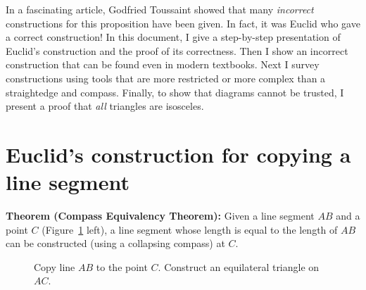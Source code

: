 \documentclass[11pt,a4paper]{article}
\begin{document}
In a fascinating article, Godfried Toussaint \cite{toussaint} showed that many \emph{incorrect} constructions for this proposition have been given. In fact, it was Euclid who gave a correct construction! In this document, I give a step-by-step presentation of Euclid's construction and the proof of its correctness. Then I show an incorrect construction that can be found even in modern textbooks. Next I survey constructions using tools that are more restricted or more complex than a straightedge and compass. Finally, to show that diagrams cannot be trusted, I present a proof that \emph{all} triangles are isosceles.


\section{Euclid's construction for copying a line segment}

\textbf{Theorem (Compass Equivalency Theorem):} Given a line segment $AB$ and a point $C$ (Figure~\ref{fig.ce-1} left), a line segment whose length is equal to the length of $AB$ can be constructed (using a collapsing compass) at $C$.
\begin{figure}[H]
\begin{center}
\caption{Copy line $AB$ to the point $C$. Construct an equilateral triangle on $AC$.}\label{fig.ce-1}
\end{center}
\end{figure}
\end{document}
